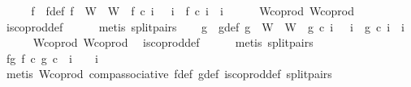 \begin{isabellebody}
%
\isadelimproof
%
\endisadelimproof
%
\isatagproof
{}\isamarkupfalse%
\ {\isacharminus}{\kern0pt}\isanewline
\ \ \isamarkupfalse%
\ f\ \ f{\isacharunderscore}{\kern0pt}def{\isacharcolon}{\kern0pt}\ {\isachardoublequoteopen}f\ {\isacharcolon}{\kern0pt}\ W{\isacharprime}{\kern0pt}\ {\isasymrightarrow}\ W\ {\isasymand}\ f\ {\isasymcirc}\isactrlsub c\ i{\isacharprime}{\kern0pt}\ \ {\isacharequal}{\kern0pt}\ i\ {\isasymand}\ f\ {\isasymcirc}\isactrlsub c\ i{\isacharprime}{\kern0pt}\ {\isacharequal}{\kern0pt}\ i\isanewline
\ \ \ \ \isamarkupfalse%
\ W{\isacharunderscore}{\kern0pt}coprod\ W{\isacharprime}{\kern0pt}{\isacharunderscore}{\kern0pt}coprod\ \isamarkupfalse%
\ is{\isacharunderscore}{\kern0pt}coprod{\isacharunderscore}{\kern0pt}def\isanewline
\ \ \ \ \isamarkupfalse%
\ {\isacharparenleft}{\kern0pt}metis\ split{\isacharunderscore}{\kern0pt}pairs{\isacharparenright}{\kern0pt}\isanewline
\isanewline
\ \ \isamarkupfalse%
\ g\ \ g{\isacharunderscore}{\kern0pt}def{\isacharcolon}{\kern0pt}\ {\isachardoublequoteopen}g\ {\isacharcolon}{\kern0pt}\ W\ {\isasymrightarrow}\ W{\isacharprime}{\kern0pt}\ {\isasymand}\ g\ {\isasymcirc}\isactrlsub c\ i\ \ {\isacharequal}{\kern0pt}\ i{\isacharprime}{\kern0pt}\ {\isasymand}\ g\ {\isasymcirc}\isactrlsub c\ i\ {\isacharequal}{\kern0pt}\ i{\isacharprime}{\kern0pt}\isanewline
\ \ \ \ \isamarkupfalse%
\ W{\isacharunderscore}{\kern0pt}coprod\ W{\isacharprime}{\kern0pt}{\isacharunderscore}{\kern0pt}coprod\ \isamarkupfalse%
\ is{\isacharunderscore}{\kern0pt}coprod{\isacharunderscore}{\kern0pt}def\isanewline
\ \ \ \ \isamarkupfalse%
\ {\isacharparenleft}{\kern0pt}metis\ split{\isacharunderscore}{\kern0pt}pairs{\isacharparenright}{\kern0pt}\isanewline
\isanewline
\ \ \isamarkupfalse%
\ fg{}{\isacharcolon}{\kern0pt}\ {\isachardoublequoteopen}{\isacharparenleft}{\kern0pt}f\ {\isasymcirc}\isactrlsub c\ g{\isacharparenright}{\kern0pt}\ {\isasymcirc}\isactrlsub c\ \ i\ \ \ {\isacharequal}{\kern0pt}\ i\isanewline
\ \ \ \ \isamarkupfalse%
\ {\isacharparenleft}{\kern0pt}metis\ W{\isacharunderscore}{\kern0pt}coprod\ comp{\isacharunderscore}{\kern0pt}associative{}\ f{\isacharunderscore}{\kern0pt}def\ g{\isacharunderscore}{\kern0pt}def\ is{\isacharunderscore}{\kern0pt}coprod{\isacharunderscore}{\kern0pt}def\ split{\isacharunderscore}{\kern0pt}pairs{\isacharparenright}{\kern0pt}\isanewline

\end{isabellebody}
